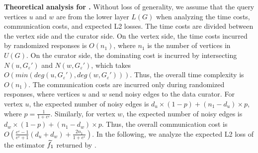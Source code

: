 \noindent
{\bf Theoretical analysis for \naive.} 
{\color{black}
Without loss of generality, we assume that the query vertices $u$ and $w$ are from the lower layer $L(G)$ when analyzing the time costs, communication costs, and expected L2 losses. 
The time costs are divided between the vertex side and the curator side.
On the vertex side, the time costs incurred by randomized responses is $O(n_1)$, where $n_1$ is the number of vertices in $U(G)$. 
On the curator side, the dominating cost is incurred by intersecting $N(u, G_{\varepsilon}')$ and $N(w, G_{\varepsilon}')$, which takes $O(min(deg(u,  G_{\varepsilon}'), deg(w,  G_{\varepsilon}')))$. Thus, the overall time complexity is $O(n_1)$. 
The communication costs are incurred only during randomized responses, where vertices $u$ and $w$ send noisy edges to the data curator. 
For vertex $u$, the expected number of noisy edges is $d_u \times (1-p) + (n_1 - d_u) \times p$, where $p = \frac{1}{1+e^{\varepsilon}}$. Similarly, for vertex $w$, the expected number of noisy edges is $d_w \times (1-p) + (n_1 - d_w) \times p$. 
Thus, the overall communication cost is $O\left(\frac{e^{\varepsilon}-1}{e^{\varepsilon}+1}(d_u + d_w) + \frac{2n_1}{1 + e^{\varepsilon}}\right)$.} 
In the following, we analyze the expected L2 loss of the estimator $\widetilde{f}_1$ returned by \naive. 

